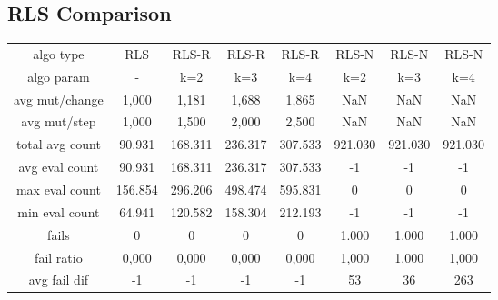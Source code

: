\subsection{RLS Comparison}

\begin{tabular}[h]{cccccccc}
algo type&            RLS&   RLS-R&   RLS-R&   RLS-R&   RLS-N&   RLS-N&   RLS-N\\
algo param&             -&     k=2&     k=3&     k=4&     k=2&     k=3&     k=4\\
avg mut/change&     1,000&   1,181&   1,688&   1,865&     NaN&     NaN&     NaN\\
avg mut/step&       1,000&   1,500&   2,000&   2,500&     NaN&     NaN&     NaN\\
\hline
total avg count&   90.931& 168.311& 236.317& 307.533& 921.030& 921.030& 921.030\\
avg eval count&    90.931& 168.311& 236.317& 307.533&      -1&      -1&      -1\\
max eval count&   156.854& 296.206& 498.474& 595.831&       0&       0&       0\\
min eval count&    64.941& 120.582& 158.304& 212.193&      -1&      -1&      -1\\
\hline
fails&                  0&       0&       0&       0&   1.000&   1.000&   1.000\\
fail ratio&         0,000&   0,000&   0,000&   0,000&   1,000&   1,000&   1,000\\
avg fail dif&          -1&      -1&      -1&      -1&      53&      36&     263\\
\end{tabular}


